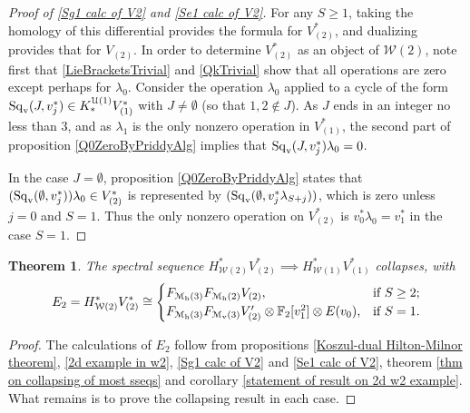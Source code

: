 \documentclass[11pt]{amsart}
\theoremstyle{plain}
\newtheorem{thm}{Theorem}[section]
\theoremstyle{definition}
\newcommand{\calW}{\mathcal{W}}
\newcommand{\calU}{\mathcal{U}}
\newcommand{\calmv}{\mathcal{M}_\textup{v}}
\newcommand{\calmh}{\mathcal{M}_\textup{h}}
\theoremstyle{plain}
\newcommand{\Sqv}{\mathrm{Sq}_\textup{v}}
\newcommand{\F}{\mathbb{F}}
\begin{document}
\begin{Calculations of HWn for n nonzero}
\begin{proof}[Proof of \ref{Sg1 calc of V2} and \ref{Se1 calc of V2}]
For any $S\geq1$, taking the homology of this differential provides the formula for $V_{(2)}^*$, and dualizing provides that for $V_{(2)}$.
In order to determine $V_{(2)}^*$ as an object of $\calW(2)$, note first that \ref{LieBracketsTrivial} and \ref{QkTrivial} show that all operations are zero except perhaps for $\lambda_0$. %
Consider the operation $\lambda_0$ applied to a cycle of the form $\Sqv(J,v_{j}^*)\in K_{*}^{\calU(1)}V^*_{(1)}$ with $J\neq\emptyset$ (so that $1,2\notin J$). As $J$ ends in an integer no less than 3, and as $\lambda_1$ is the only nonzero operation in $V_{(1)}^*$, the second part of proposition \ref{Q0ZeroByPriddyAlg} implies that $\Sqv(J,v_{j}^*)\lambda_0=0$.

In the case $J=\emptyset$, proposition \ref{Q0ZeroByPriddyAlg} states that $(\Sqv(\emptyset,v_{j}^*))\lambda_0\in V_{(2)}^*$ is represented by $(\Sqv(\emptyset,v_{j}^*\lambda_{S+j}))$, which is zero unless $j=0$ and $S=1$. Thus the only nonzero operation on $V_{(2)}^*$ is $v_0^*\lambda_0=v_1^*$ in the case $S=1$.
\end{proof}
\begin{thm}The spectral sequence $H^*_{\calW(2)}V_{(2)}^*\implies H^*_{\calW(1)}V_{(1)}^*$ collapses, with
\[E_2=H^*_{\calW(2)}V_{(2)}^*\cong\begin{cases}
F_{\calmh(3)}F_{\calmh(2)}V_{(2)},&\textup{if }S\geq2;\\
F_{\calmh(3)}F_{\calmv(3)}V'_{(2)}\otimes \F_2[v_1^{2}]\otimes E(v_0),&\textup{if }S=1.
\end{cases}
\]
\end{thm}
\begin{proof}
The calculations of $E_2$ follow from propositions \ref{Koszul-dual Hilton-Milnor theorem}, \ref{2d example in w2}, \ref{Sg1 calc of V2} and \ref{Se1 calc of V2}, theorem \ref{thm on collapsing of most sseqs} and corollary \ref{statement of result on 2d w2 example}. What remains is to prove the collapsing result in each case.


\end{proof}
\end{Calculations of HWn for n nonzero}
\end{document}
